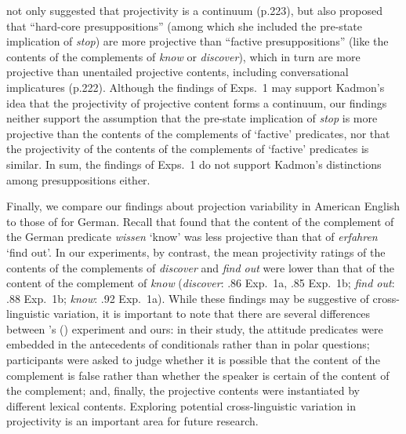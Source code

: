 \documentclass[11pt,fleqn]{article}
\newcommand{\6}{\mbox{$[\hspace*{-.6mm}[$}}
\newcommand{\9}{\mbox{$]\hspace*{-.6mm}]$}}
\newcommand{\citetpos}[1]{\citeauthor{#1}'s (\citeyear{#1})}
\begin{document}
\citet{kadmon01} not only suggested that projectivity is a continuum (p.223), but also proposed that ``hard-core presuppositions'' (among which she included the pre-state implication of {\em stop}) are more projective than ``factive presuppositions'' (like the contents of the complements of {\em know} or {\em discover}), which in turn are more projective than unentailed projective contents, including conversational implicatures (p.222). Although the findings of Exps.~1 may support Kadmon's idea that the projectivity of projective content forms a continuum, our findings neither support the assumption that the pre-state implication of {\em stop} is more projective than the contents of the complements of `factive' predicates, nor that the projectivity of the contents of the complements of `factive' predicates is similar. In sum, the findings of Exps.~1 do not support Kadmon's distinctions among presuppositions either.

Finally, we compare our findings about projection variability in American English to those of \citealt{xue-onea11} for German. Recall that \citet{xue-onea11} found that the content of the complement of the German predicate {\em wissen} `know' was less projective than that of {\em erfahren} `find out'. In our experiments, by contrast, the mean projectivity ratings of the contents of the complements of {\em discover} and {\em find out} were lower  than that of the content of the complement of {\em know} ({\em discover}: .86 Exp.~1a, .85 Exp.~1b; {\em find out}: .88 Exp.~1b; {\em know}: .92 Exp.~1a). While these findings may be suggestive of cross-linguistic variation, it is important to note that there are several differences between \citetpos{xue-onea11} experiment and ours: in their study, the attitude predicates were embedded in the antecedents of conditionals rather than in polar questions; participants were asked to judge whether it is possible that the content of the complement is false rather than whether the speaker is certain of the content of the complement; and, finally, the projective contents were instantiated by different lexical contents. Exploring potential cross-linguistic variation in projectivity is an important area for future research.
\end{document}

